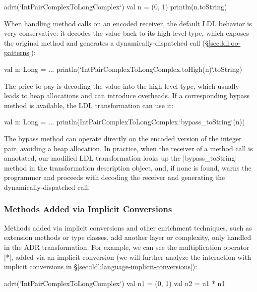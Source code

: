 \begin{lstlisting-nobreak}
adrt(`IntPairComplexToLongComplex`) {
  val n = (0, 1)
  println(n.toString)
}
\end{lstlisting-nobreak}

When handling method calls on an encoded receiver, the default LDL behavior is very conservative: it decodes the value back to its high-level type, which exposes the original method and generates a dynamically-dispatched call (\S\ref{sec:ldl:oo-patterns}):

\begin{lstlisting-nobreak}
val n: Long = ...
println(`IntPairComplexToLongComplex.toHigh(n)`.toString)
\end{lstlisting-nobreak}

The price to pay is decoding the value into the high-level type, which usually leads to heap allocations and can introduce overheads. If a corresponding bypass method is available, the LDL transformation can use it:

\begin{lstlisting-nobreak}
val n: Long = ...
println(IntPairComplexToLongComplex.`bypass_toString`(n))
\end{lstlisting-nobreak}

The bypass method can operate directly on the encoded version of the integer pair, avoiding a heap allocation. In practice, when the receiver of a method call is annotated, our modified LDL transformation looks up the |bypass_toString| method in the transformation description object, and, if none is found, warns the programmer and proceeds with decoding the receiver and generating the dynamically-dispatched call.


\subsubsection*{Methods Added via Implicit Conversions}

Methods added via implicit conversions and other enrichment techniques, such as extension methods or type classes, add another layer or complexity, only handled in the ADR transformation. For example, we can see the multiplication operator |*|, added via an implicit conversion (we will further analyze the interaction with implicit conversions in \S\ref{sec:ildl:language-implicit-conversions}):

\begin{lstlisting-nobreak}
adrt(`IntPairComplexToLongComplex`) {
  val n1 = (0, 1)
  val n2 = n1 * n1
}
\end{lstlisting-nobreak}

